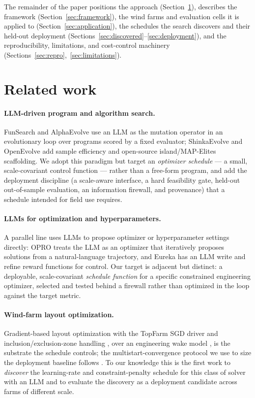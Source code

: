 \documentclass[11pt]{article}
\begin{document}
The remainder of the paper positions the approach (Section~\ref{sec:related}), describes
the framework (Section~\ref{sec:framework}), the wind farms and evaluation cells it is
applied to (Section~\ref{sec:application}), the schedules the search discovers and their
held-out deployment (Sections~\ref{sec:discovered}--\ref{sec:deployment}), and the
reproducibility, limitations, and cost-control machinery
(Sections~\ref{sec:repro},~\ref{sec:limitations}).

\section{Related work}
\label{sec:related}
\paragraph{LLM-driven program and algorithm search.} FunSearch
\citep{fawzi2024funsearch} and AlphaEvolve \citep{deepmind2025alphaevolve} use an LLM as
the mutation operator in an evolutionary loop over programs scored by a fixed evaluator;
ShinkaEvolve \citep{shinka2025} and OpenEvolve \citep{openevolve2025} add sample
efficiency and open-source island/MAP-Elites scaffolding. We adopt this paradigm but
target an \emph{optimizer schedule} --- a small, scale-covariant control function ---
rather than a free-form program, and add the deployment discipline (a scale-aware
interface, a hard feasibility gate, held-out out-of-sample evaluation, an information firewall, and
provenance) that a schedule intended for field use requires.

\paragraph{LLMs for optimization and hyperparameters.} A parallel line uses LLMs to
propose optimizer or hyperparameter settings directly: OPRO \citep{yang2023opro} treats
the LLM as an optimizer that iteratively proposes solutions from a natural-language
trajectory, and Eureka \citep{ma2023eureka} has an LLM write and refine reward functions
for control. Our target is adjacent but distinct: a deployable, scale-covariant
\emph{schedule function} for a specific constrained engineering optimizer, selected and
tested behind a firewall rather than optimized in the loop against the target metric.

\paragraph{Wind-farm layout optimization.} Gradient-based layout optimization with the
TopFarm SGD driver \citep{quick2022sgd} and inclusion/exclusion-zone handling
\citep{criadorisco2024}, over an engineering wake model \citep{bastankhah2014wake}, is
the substrate the schedule controls; the multistart-convergence protocol we use to size
the deployment baseline follows \citet{quick2026neighbors}. To our knowledge this is the
first work to \emph{discover} the learning-rate and constraint-penalty schedule for this
class of solver with an LLM and to evaluate the discovery as a deployment candidate across
farms of different scale.
\end{document}
